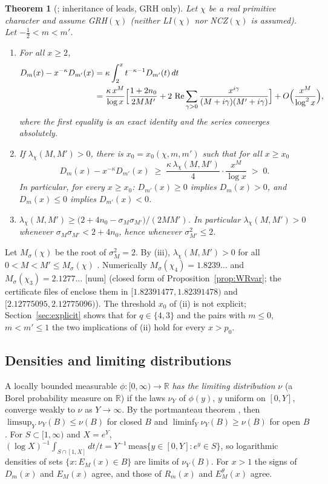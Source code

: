 \documentclass[11pt]{amsart}
\newtheorem{theorem}{Theorem}[section]
\theoremstyle{definition}
\numberwithin{equation}{section}
\newcommand{\re}{\operatorname{Re}}
\newcommand{\Ein}{E^{\theta}}
\newcommand{\numtag}{\textsf{[num]}}
\begin{document}
\begin{theorem}[{\cite[Theorem~A]{MC}}; inheritance of leads, GRH
only]\label{thm:MCA}
Let $\chi$ be a real primitive character and assume GRH$(\chi)$
(neither LI$(\chi)$ nor NCZ$(\chi)$ is assumed). Let
$-\tfrac12<m<m'$.
\begin{enumerate}
\item[(i)] For all $x\ge2$,
\begin{align*}
D_m(x)-x^{-\kappa}D_{m'}(x)
&=\kappa\int_2^xt^{-\kappa-1}D_{m'}(t)\,dt\\
&=\frac{\kappa\,x^{M}}{\log x}\Bigl[\frac{1+2n_0}{2MM'}
+2\,\re\sum_{\gamma>0}\frac{x^{i\gamma}}{(M+i\gamma)(M'+i\gamma)}\Bigr]
+O\Bigl(\frac{x^{M}}{\log^2x}\Bigr),
\end{align*}
where the first equality is an exact identity and the series
converges absolutely.
\item[(ii)] If $\lambda_\chi(M,M')>0$, there is
$x_0=x_0(\chi,m,m')$ such that for all $x\ge x_0$
\[
D_m(x)-x^{-\kappa}D_{m'}(x)\;\ge\;
\frac{\kappa\,\lambda_\chi(M,M')}{4}\cdot\frac{x^{M}}{\log x}\;>\;0 .
\]
In particular, for every $x\ge x_0$: $D_{m'}(x)\ge0$ implies
$D_m(x)>0$, and $D_m(x)\le0$ implies $D_{m'}(x)<0$.
\item[(iii)] $\lambda_\chi(M,M')\ge
\bigl(2+4n_0-\sigma_M\sigma_{M'}\bigr)/(2MM')$. In particular
$\lambda_\chi(M,M')>0$ whenever $\sigma_M\sigma_{M'}<2+4n_0$, hence
whenever $\sigma_{M'}^2\le2$.
\end{enumerate}
\end{theorem}

Let $M_\sigma(\chi)$ be the root of $\sigma_M^2=2$. By (iii),
$\lambda_\chi(M,M')>0$ for all $0<M<M'\le M_\sigma(\chi)$
\cite[the remark on the range of validity of Theorem~A]{MC}. Numerically
$M_\sigma(\chi_4)=1.8239\ldots$ and $M_\sigma(\chi_3)=2.1277\ldots$
\numtag{} (closed form of Proposition~\ref{prop:WRvar}; the
certificate files of \cite{MC} enclose them in
$[1.82391477,1.82391478)$ and $[2.12775095,2.12775096)$). The
threshold $x_0$ of (ii) is not explicit; Section~\ref{sec:explicit}
shows that for $q\in\{4,3\}$ and the pairs with $m\le0$, $m<m'\le1$
the two implications of (ii) hold for every $x>p_0$.

\subsection{Densities and limiting distributions}
\label{subsec:densities}
A locally bounded measurable $\phi:[0,\infty)\to\mathbb R$ \emph{has
the limiting distribution} $\nu$ (a Borel probability measure on
$\mathbb R$) if the laws $\nu_Y$ of $\phi(y)$, $y$ uniform on $[0,Y]$,
converge weakly to $\nu$ as $Y\to\infty$. By the portmanteau theorem
\cite[Theorem~2.1]{Bil99}, then
$\limsup_Y\nu_Y(B)\le\nu(B)$ for closed $B$ and
$\liminf_Y\nu_Y(B)\ge\nu(B)$ for open $B$. For $S\subset[1,\infty)$
and $X=e^Y$, $(\log X)^{-1}\int_{S\cap[1,X]}dt/t
=Y^{-1}\,\mathrm{meas}\{y\in[0,Y]:e^y\in S\}$, so logarithmic
densities of sets $\{x:E_M(x)\in B\}$ are limits of $\nu_Y(B)$. For
$x>1$ the signs of $D_m(x)$ and $E_M(x)$ agree, and those of
$R_m(x)$ and $\Ein_M(x)$ agree.
\end{document}
